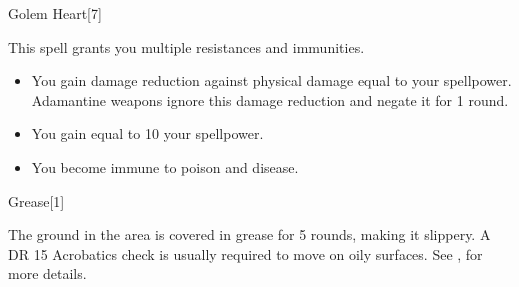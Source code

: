 \begin{spellsection}{Golem Heart}[7]
    \begin{spellheader}
    \end{spellheader}
    \begin{spellcontent}
        \begin{spelltargetinginfo}
        \end{spelltargetinginfo}
        \begin{spelleffects}
            \spelleffect This spell grants you multiple resistances and immunities.
            \begin{itemize}
                \item You gain damage reduction against physical damage equal to your spellpower. Adamantine weapons ignore this damage reduction and negate it for 1 round.
                \item You gain  equal to 10 \add your spellpower.
                \item You become immune to poison and disease.
            \end{itemize}
            \spelldur \durshort
        \end{spelleffects}
    \end{spellcontent}
    \begin{spellfooter}
        \miscastexplode
    \end{spellfooter}
\end{spellsection}

\begin{spellsection}{Grease}[1]
    \begin{spellheader}
    \end{spellheader}
    \begin{spellcontent}
        \begin{spelltargetinginfo}
        \end{spelltargetinginfo}
        \begin{spelleffects}
            \spelleffect The ground in the area is covered in grease for 5 rounds, making it slippery. A DR 15 Acrobatics check is usually required to move on oily surfaces. See , for more details.
        \end{spelleffects}
    \end{spellcontent}
    \begin{spellfooter}
        \miscastyou
    \end{spellfooter}
    \begin{spellaugments}
    \end{spellaugments}
\end{spellsection}

